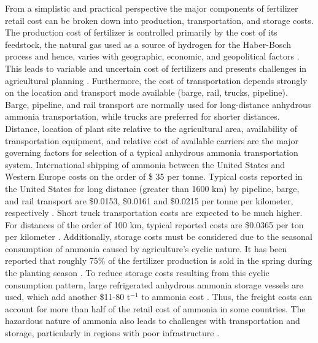 From a simplistic and practical perspective the major components of fertilizer retail cost can be broken down into production, transportation, and storage costs. The production cost of fertilizer is controlled primarily by the cost of its feedstock, the natural gas used as a source of hydrogen for the Haber-Bosch process and hence, varies with geographic, economic, and geopolitical factors \cite{Huang2007,Etienne2016}. 
This leads to variable and uncertain cost of fertilizers and presents challenges in agricultural planning \cite{Etienne2016}. Furthermore, the cost of transportation depends strongly on the location and transport mode available (barge, rail, trucks, pipeline). Barge, pipeline, and rail transport are normally used for long-distance anhydrous ammonia transportation, while trucks are preferred for shorter distances. Distance, location of plant site relative to the agricultural area, availability of transportation equipment, and relative cost of available carriers are the major governing factors for selection of a typical anhydrous ammonia transportation system. International shipping of ammonia between the United States and Western Europe costs on the order of \$ 35 per tonne.\cite{ammonia_encyclopedia} Typical costs reported in the United States for long distance (greater than 1600 km) by pipeline, barge, and rail transport are \$0.0153, \$0.0161 and \$0.0215 per tonne per kilometer, respectively \cite{ammonia_encyclopedia}.  Short truck transportation costs are expected to be much higher. For distances of the order of 100 km, typical reported costs are \$0.0365 per ton per kilometer \cite{ammonia_encyclopedia}. Additionally, storage costs must be considered due to the seasonal consumption of ammonia caused by agriculture's cyclic nature. It has been reported that roughly 75\% of the fertilizer production is sold in the spring during the planting season \cite{ammonia_encyclopedia}. To reduce storage costs resulting from this cyclic consumption pattern, large refrigerated anhydrous ammonia storage vessels are used, which add another \$11-80 t$^{-1}$ to ammonia cost \cite{IFDC_1998,ammonia_encyclopedia}. Thus, the freight costs can account for more than half of the retail cost of ammonia in some countries.
The hazardous nature of ammonia also leads to challenges with transportation and storage, particularly in regions with poor infrastructure \cite{Etienne2016}. 


